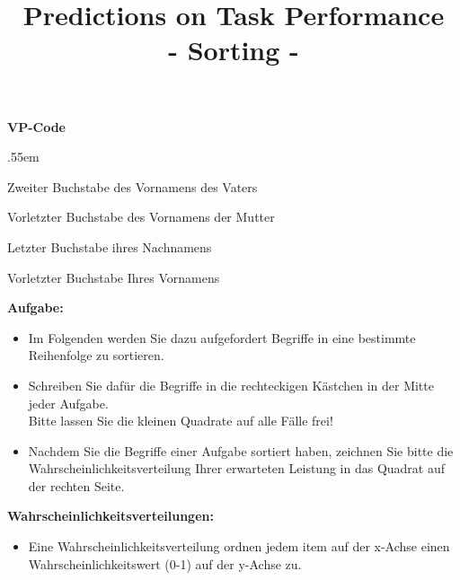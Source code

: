 \documentclass[
ngerman,
accentcolor=9c,%
identbarcolor=9c,
]{tudaexercise}
\title{Predictions on Task Performance\\- Sorting -}
\begin{document}
\maketitle
\vspace{-3mm}


\textbf{VP-Code}
\begin{itemize}
	\begin{minipage}{.45\textwidth}
		\vspace{-2cm}
		\itemsep.55em
		\item Zweiter Buchstabe des Vornamens des Vaters
		\item Vorletzter Buchstabe des Vornamens der Mutter
		\item Letzter Buchstabe ihres Nachnamens
		\item Vorletzter Buchstabe Ihres Vornamens	
	\end{minipage}
	\begin{minipage}{.55\textwidth}
		
	\end{minipage}
\end{itemize}

\textbf{Aufgabe:}
\begin{itemize}
	\item Im Folgenden werden Sie dazu aufgefordert Begriffe in eine bestimmte Reihenfolge zu sortieren.
	\item Schreiben Sie dafür die Begriffe in die rechteckigen Kästchen in der Mitte jeder Aufgabe.\\Bitte lassen Sie die kleinen Quadrate auf alle Fälle frei!
	\item Nachdem Sie die Begriffe einer Aufgabe sortiert haben, zeichnen Sie bitte die Wahrscheinlichkeitsverteilung Ihrer erwarteten Leistung in das  Quadrat auf der rechten Seite.
	
\end{itemize}

\textbf{Wahrscheinlichkeitsverteilungen:}
\begin{itemize}
	\item Eine Wahrscheinlichkeitsverteilung ordnen jedem item auf der x-Achse einen Wahrscheinlichkeitswert (0-1) auf der y-Achse zu.
\end{itemize}
\newpage
\end{document}
